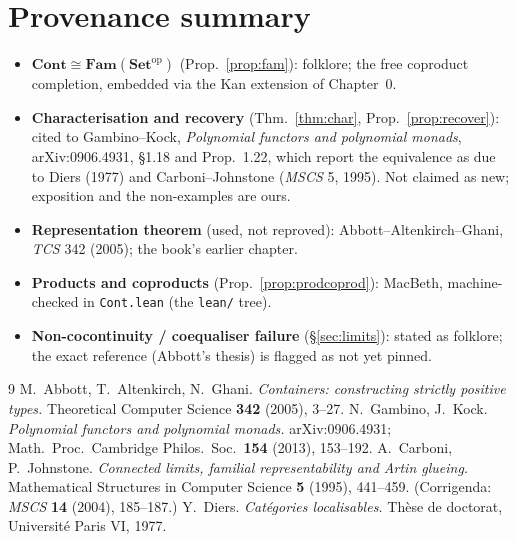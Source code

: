\documentclass[11pt]{article}
\theoremstyle{plain}
\theoremstyle{definition}
\newcommand{\Set}{\mathbf{Set}}
\newcommand{\Cont}{\mathbf{Cont}}
\newcommand{\Fam}{\mathbf{Fam}}
\newcommand{\op}{^{\mathrm{op}}}
\newcommand{\iso}{\cong}
\begin{document}
\section*{Provenance summary}
\begin{itemize}
\item \textbf{$\Cont\iso\Fam(\Set\op)$} (Prop.~\ref{prop:fam}): folklore; the free
      coproduct completion, embedded via the Kan extension of Chapter~0.
\item \textbf{Characterisation and recovery} (Thm.~\ref{thm:char},
      Prop.~\ref{prop:recover}): cited to Gambino--Kock, \emph{Polynomial functors and
      polynomial monads}, arXiv:0906.4931, \S1.18 and Prop.~1.22, which report the
      equivalence as due to Diers (1977) and Carboni--Johnstone (\emph{MSCS} 5, 1995).
      Not claimed as new; exposition and the non-examples are ours.
\item \textbf{Representation theorem} (used, not reproved): Abbott--Altenkirch--Ghani,
      \emph{TCS} 342 (2005); the book's earlier chapter.
\item \textbf{Products and coproducts} (Prop.~\ref{prop:prodcoprod}): MacBeth,
      machine-checked in \texttt{Cont.lean} (the \texttt{lean/} tree).
\item \textbf{Non-cocontinuity / coequaliser failure} (\S\ref{sec:limits}): stated as
      folklore; the exact reference (Abbott's thesis) is flagged as not yet pinned.
\end{itemize}

\begin{thebibliography}{9}
 M.~Abbott, T.~Altenkirch, N.~Ghani.
  \emph{Containers: constructing strictly positive types.}
  Theoretical Computer Science \textbf{342} (2005), 3--27.
 N.~Gambino, J.~Kock.
  \emph{Polynomial functors and polynomial monads.}
  arXiv:0906.4931; Math.\ Proc.\ Cambridge Philos.\ Soc.\ \textbf{154} (2013), 153--192.
 A.~Carboni, P.~Johnstone.
  \emph{Connected limits, familial representability and Artin glueing.}
  Mathematical Structures in Computer Science \textbf{5} (1995), 441--459.
  (Corrigenda: \emph{MSCS} \textbf{14} (2004), 185--187.)
 Y.~Diers.
  \emph{Cat\'egories localisables.} Th\`ese de doctorat, Universit\'e Paris VI, 1977.
\end{thebibliography}
\end{document}

